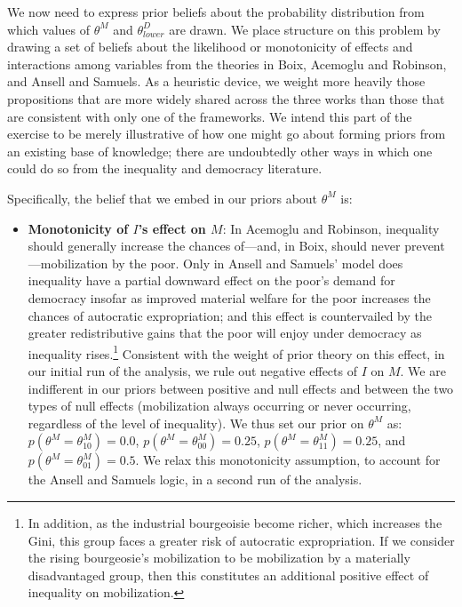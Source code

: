\documentclass[12pt,]{book}
\providecommand{\tightlist}{%
  \setlength{\itemsep}{0pt}\setlength{\parskip}{0pt}}
\let\rmarkdownfootnote\footnote%
\def\footnote{\protect\rmarkdownfootnote}
\begin{document}
We now need to express prior beliefs about the probability distribution from which values of \(\theta^M\) and \(\theta^D_{lower}\) are drawn. We place structure on this problem by drawing a set of beliefs about the likelihood or monotonicity of effects and interactions among variables from the theories in Boix, Acemoglu and Robinson, and Ansell and Samuels. As a heuristic device, we weight more heavily those propositions that are more widely shared across the three works than those that are consistent with only one of the frameworks. We intend this part of the exercise to be merely illustrative of how one might go about forming priors from an existing base of knowledge; there are undoubtedly other ways in which one could do so from the inequality and democracy literature.

Specifically, the belief that we embed in our priors about \(\theta^M\) is:

\begin{itemize}
\tightlist
\item
  \textbf{Monotonicity of \(I\)'s effect on \(M\)}: In Acemoglu and Robinson, inequality should generally increase the chances of---and, in Boix, should never prevent---mobilization by the poor. Only in Ansell and Samuels' model does inequality have a partial downward effect on the poor's demand for democracy insofar as improved material welfare for the poor increases the chances of autocratic expropriation; and this effect is countervailed by the greater redistributive gains that the poor will enjoy under democracy as inequality rises.\footnote{In addition, as the industrial bourgeoisie become richer, which increases the Gini, this group faces a greater risk of autocratic expropriation. If we consider the rising bourgeosie's mobilization to be mobilization by a materially disadvantaged group, then this constitutes an additional positive effect of inequality on mobilization.} Consistent with the weight of prior theory on this effect, in our initial run of the analysis, we rule out negative effects of \(I\) on \(M\). We are indifferent in our priors between positive and null effects and between the two types of null effects (mobilization always occurring or never occurring, regardless of the level of inequality). We thus set our prior on \(\theta^M\) as: \(p(\theta^M=\theta^M_{10})=0.0\), \(p(\theta^M=\theta^M_{00})=0.25\), \(p(\theta^M=\theta^M_{11})=0.25\), and \(p(\theta^M=\theta^M_{01})=0.5\). We relax this monotonicity assumption, to account for the Ansell and Samuels logic, in a second run of the analysis.
\end{itemize}
\end{document}
